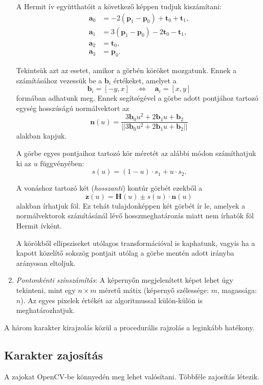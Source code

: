 \begin{enumerate}
A Hermit ív együtthatóit a következő képpen tudjuk kiszámítani:
\begin{align*}
\textbf{a}_0 &= -2(\textbf{p}_1 - \textbf{p}_0) + \textbf{t}_0 + \textbf{t}_1, \\
\textbf{a}_1 &= 3(\textbf{p}_1 - \textbf{p}_0) - 2 \textbf{t}_0 - \textbf{t}_1, \\
\textbf{a}_2 &= \textbf{t}_0, \\
\textbf{a}_3 &= \textbf{p}_0.
\end{align*}

Tekintsük azt az esetet, amikor a görbén köröket mozgatunk. Ennek a számításához vezessük be a $\textbf{b}_i$ értékeket, amelyet a
$$
\textbf{b}_i = [-y, x] \quad \Leftrightarrow \quad \textbf{a}_i = [x, y]
$$
formában adhatunk meg. Ennek segítségével a görbe adott pontjához tartozó egység hosszúságú normálvektort az
$$
\textbf{n}(u) = \dfrac{3 \textbf{b}_0 u^2 + 2 \textbf{b}_1 u + \textbf{b}_2}{
||3 \textbf{b}_0 u^2 + 2 \textbf{b}_1 u + \textbf{b}_2||
}
$$
alakban kapjuk.

A görbe egyes pontjaihoz tartozó kör méretét az alábbi módon számíthatjuk ki az $u$ függvényében:
$$
s(u) = (1 - u) \cdot s_1 + u \cdot s_2.
$$

A vonáshoz tartozó két (\textit{hosszanti}) kontúr görbét ezekből a
$$
\textbf{z}(u) = \textbf{H}(u) \pm s(u) \cdot \textbf{n}(u)
$$
alakban írhatjuk föl. Ez tehát tulajdonképpen két görbét ír le, amelyek a normálvektorok számításánál lévő hosszmeghatározás miatt nem írhatók föl Hermit ívként.

A körökből ellipsziseket utólagos transformációval is kaphatunk, vagyis ha a kapott közelítő sokszög pontjait utólag a görbe mentén adott irányba arányosan eltoljuk.

\item \textit{Pontonkénti színszámítás}: A képernyőn megjelenített képet lehet úgy tekinteni, mint egy $n \times m$ méretű mátix (képernyő szélessége: $m$, magassága: $n$). Az egyes pixelek értékét az algoritmussal külön-külön is meghatározhatjuk.

\end{enumerate}

A három karakter kirajzolás közül a procedurális rajzolás a leginkább hatékony.

\subsection{Karakter zajosítás}

A zajokat OpenCV-be \cite{OpenCVli86} könnyedén meg lehet valósítani. Többféle zajosítás létezik\cite{WANG1973303}.

